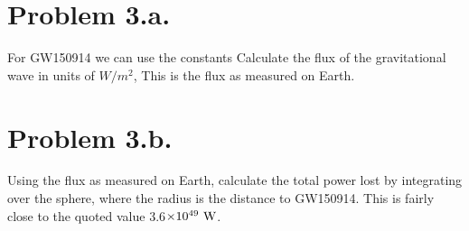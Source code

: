 \documentclass{article}
\begin{document}


\section*{Problem 3.a.}
For GW150914 we can use the constants
Calculate the flux of the gravitational wave in units of $W/m^2$,
This is the flux as measured on Earth. 
\section*{Problem 3.b.}
Using the flux as measured on Earth, calculate the total power lost by integrating over the sphere, where the radius is the distance to GW150914.
This is fairly close to the quoted value 3.6$\times 10^{49}\textrm{ W}$.
\end{document}
